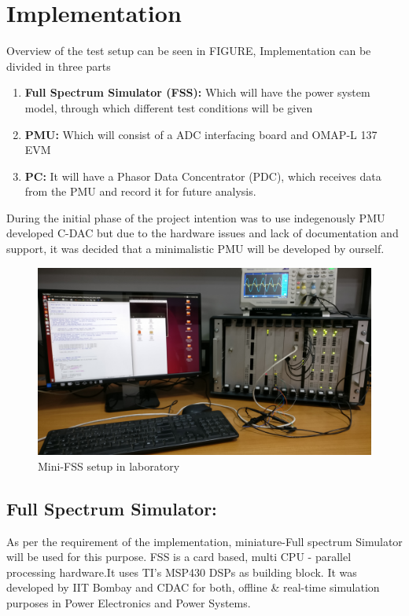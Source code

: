 \section{Implementation}
Overview of the test setup can be seen in FIGURE, Implementation can be divided in three parts
\begin{enumerate}
\item \textbf{Full Spectrum Simulator (FSS):} Which will have the power system model, through which different test conditions will be given
\item \textbf{PMU:} Which will consist of a ADC interfacing board and OMAP-L 137 EVM
\item \textbf{PC:} It will have a Phasor Data Concentrator (PDC), which receives data from the PMU and record it for future analysis.
\end{enumerate}
During the initial phase of the project intention was to use indegenously PMU developed C-DAC but due to the hardware issues and lack of documentation and support, it was decided that a minimalistic PMU will be developed by ourself.

\begin{figure}[t]
\includegraphics[width=\columnwidth]{fig/FSS_setup.jpg}
\caption{Mini-FSS setup in laboratory}
\label{fig:fss_setup}
\end{figure}

\subsection{Full Spectrum Simulator:}
As per the requirement of the implementation, miniature-Full spectrum Simulator will be used for this purpose. FSS is a card based, multi CPU - parallel processing hardware.It uses TI's MSP430 DSPs as building block. It was developed by IIT Bombay and CDAC for both, offline \& real-time  simulation purposes in Power Electronics and Power Systems.

